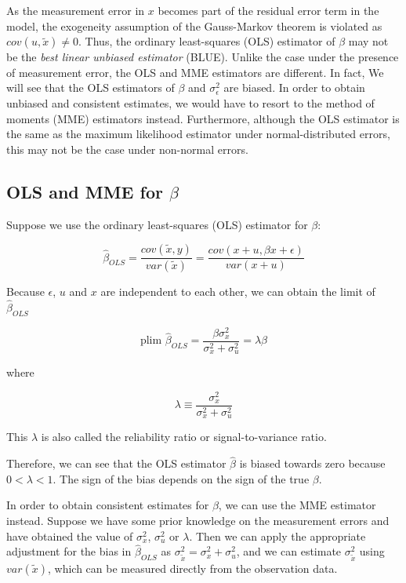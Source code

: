 \documentclass{article}
\begin{document}
As the measurement error in $x$ becomes part of the residual error term in the model, the exogeneity assumption of the Gauss-Markov theorem is violated as $cov(u, \tilde{x}) \neq 0$.
Thus, the ordinary least-squares (OLS) estimator of $\beta$ may not be the \textit{best linear unbiased estimator} (BLUE).
Unlike the case under the presence of measurement error, the OLS and MME estimators are different.
In fact, We will see that the OLS estimators of $\beta$ and $\sigma_\epsilon^2$ are biased. 
In order to obtain unbiased and consistent estimates, we would have to resort to the method of moments (MME) estimators instead. 
Furthermore, although the OLS estimator is the same as the maximum likelihood estimator under normal-distributed errors, this may not be the case under non-normal errors. 

\subsection{OLS and MME for $\beta$}

Suppose we use the ordinary least-squares (OLS) estimator for $\beta$:

\begin{equation}
    \hat{\beta}_{OLS} = \frac{cov(\tilde{x}, y)}{var(\tilde{x})} = \frac{cov(x+u, \beta x + \epsilon)}{var(x + u)}
\end{equation}

Because $\epsilon$, $u$ and $x$ are independent to each other, we can obtain the limit of $\hat{\beta}_{OLS}$

\begin{equation}
    \textrm{plim } \hat{\beta}_{OLS} = \frac{\beta \sigma^2_x}{\sigma^2_x + \sigma^2_u} = \lambda \beta
\end{equation}

where

\begin{equation}
    \lambda \equiv \frac{\sigma_x^2}{\sigma_x^2 + \sigma_u^2}
\end{equation}

This $\lambda$ is also called the reliability ratio or signal-to-variance ratio.

Therefore, we can see that the OLS estimator $\hat{\beta}$ is biased towards zero because $0 < \lambda < 1$. The sign of the bias depends on the sign of the true $\beta$.

In order to obtain consistent estimates for $\beta$, we can use the MME estimator instead.
Suppose we have some prior knowledge on the measurement errors and have obtained the value of $\sigma_x^2$, $\sigma_u^2$ or $\lambda$.
Then we can apply the appropriate adjustment for the bias in $\hat{\beta}_{OLS}$ as $\sigma^2_{\tilde{x}} = \sigma^2_x + \sigma^2_u$, and we can estimate $\sigma^2_{\tilde{x}}$ using $var(\tilde{x})$, which can be measured directly from the observation data. 
\end{document}

